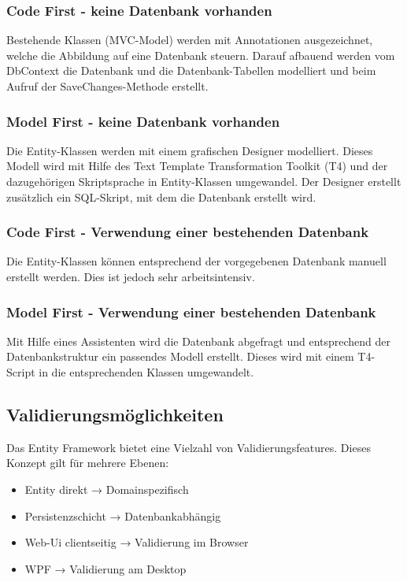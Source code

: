 \subsubsection{Code First - keine Datenbank vorhanden}
Bestehende Klassen (MVC-Model) werden mit Annotationen ausgezeichnet, welche die Abbildung auf eine Datenbank steuern.
Darauf afbauend werden vom DbContext die Datenbank und die Datenbank-Tabellen modelliert und beim Aufruf der SaveChanges-Methode erstellt.

\subsubsection{Model First - keine Datenbank vorhanden}
Die Entity-Klassen werden mit einem grafischen Designer modelliert. Dieses Modell wird mit Hilfe des Text Template Transformation Toolkit (T4) und 
der dazugehörigen Skriptsprache in Entity-Klassen umgewandel. Der Designer erstellt zusätzlich ein SQL-Skript, mit dem die Datenbank erstellt wird.

\subsubsection{Code First - Verwendung einer bestehenden Datenbank}
Die Entity-Klassen können entsprechend der vorgegebenen Datenbank manuell erstellt werden. Dies ist jedoch sehr arbeitsintensiv.

\subsubsection{Model First - Verwendung einer bestehenden Datenbank}
Mit Hilfe eines Assistenten wird die Datenbank abgefragt und entsprechend der Datenbankstruktur ein passendes Modell erstellt.
Dieses wird mit einem T4-Script in die entsprechenden Klassen umgewandelt.

\subsection{Validierungsmöglichkeiten}
Das Entity Framework bietet eine Vielzahl von Validierungsfeatures. Dieses Konzept gilt für mehrere
Ebenen:

\begin{itemize}
    \item Entity direkt → Domainspezifisch
    \item Persistenzschicht → Datenbankabhängig
    \item Web-Ui clientseitig → Validierung im Browser
    \item WPF → Validierung am Desktop
\end{itemize}

